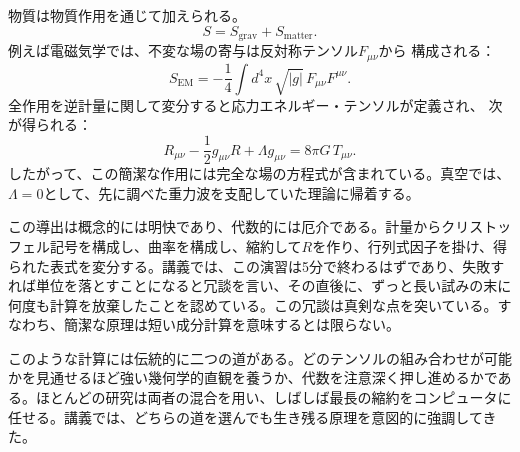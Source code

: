 物質は物質作用を通じて加えられる。
\begin{equation}
 S=S_{\mathrm{grav}}+S_{\mathrm{matter}}.
\end{equation}
例えば電磁気学では、不変な場の寄与は反対称テンソル\(F_{\mu\nu}\)から
構成される：
\begin{equation}
 S_{\mathrm{EM}}
 =-\frac14
 \int d^4x\,\sqrt{|g|}\,
 F_{\mu\nu}F^{\mu\nu}.
\end{equation}
全作用を逆計量に関して変分すると応力エネルギー・テンソルが定義され、
次が得られる：
\begin{equation}
 R_{\mu\nu}
 -\frac12 g_{\mu\nu}R
 +\Lambda g_{\mu\nu}
 =8\pi G\,T_{\mu\nu}.
 \label{eq:einstein-from-action}
\end{equation}
したがって、この簡潔な作用には完全な場の方程式が含まれている。真空では、
\(\Lambda=0\)として、先に調べた重力波を支配していた理論に帰着する。

\begin{classroomqa}
\end{classroomqa}

この導出は概念的には明快であり、代数的には厄介である。計量からクリストッフェル記号を構成し、曲率を構成し、縮約して\(R\)を作り、行列式因子を掛け、得られた表式を変分する。講義では、この演習は5分で終わるはずであり、失敗すれば単位を落とすことになると冗談を言い、その直後に、ずっと長い試みの末に何度も計算を放棄したことを認めている。この冗談は真剣な点を突いている。すなわち、簡潔な原理は短い成分計算を意味するとは限らない。

\begin{classroomqa}
\end{classroomqa}

このような計算には伝統的に二つの道がある。どのテンソルの組み合わせが可能かを見通せるほど強い幾何学的直観を養うか、代数を注意深く押し進めるかである。ほとんどの研究は両者の混合を用い、しばしば最長の縮約をコンピュータに任せる。講義では、どちらの道を選んでも生き残る原理を意図的に強調してきた。

